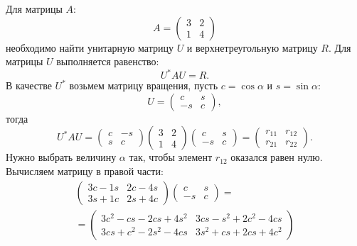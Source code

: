 \begin{example}
    Для матрицы $A$:
    \[
        A = \begin{pmatrix}
                3 & 2 \\
                1 & 4
        \end{pmatrix}
    \]
    необходимо найти унитарную матрицу $U$ и верхнетреугольную матрицу $R$. Для матрицы $U$ выполняется равенство:
    \[
        U^* A U = R.
    \]
    В качестве $U^*$ возьмем матрицу вращения, пусть $c = \cos \alpha$ и $s = \sin \alpha$:
    \[
        U
        = \begin{pmatrix}
              c  & s \\
              -s & c
        \end{pmatrix} ,
    \]
    тогда
    \[
        U^* A U
        = \begin{pmatrix}
              c & - s \\
              s & c
        \end{pmatrix}
        \begin{pmatrix}
            3 & 2 \\
            1 & 4
        \end{pmatrix}
        \begin{pmatrix}
            c   & s \\
            - s & c
        \end{pmatrix}
        = \begin{pmatrix}
              r_{11} & r_{12} \\
              r_{21} & r_{22}
        \end{pmatrix} .
    \]
    Нужно выбрать величину $\alpha$ так, чтобы элемент $r_{12}$ оказался равен нулю. Вычисляем матрицу в правой части:
    \begin{multline*}
        \begin{pmatrix}
            3 c - 1 s & 2 c - 4 s \\
            3 s + 1 c & 2 s + 4 c
        \end{pmatrix}
        \begin{pmatrix}
            c   & s \\
            - s & c
        \end{pmatrix}
        = \\
        = \begin{pmatrix}
              3 c^2 - c s - 2 c s + 4 s^2 & 3 c s - s^2 + 2 c^2 - 4 c s \\
              3 c s + c^2 - 2 s^2 - 4 c s & 3 s^2 + c s + 2 c s + 4 c^2

\end{pmatrix}
\end{multline*}
\end{example}
